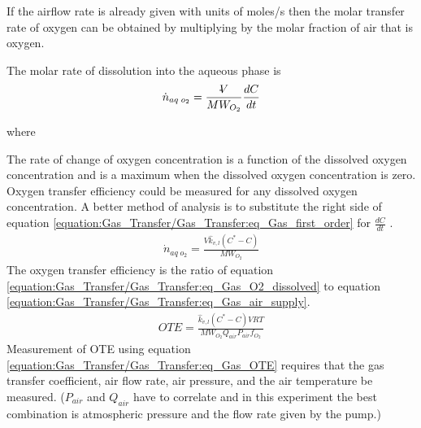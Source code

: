 \documentclass[letterpaper,10pt,english]{sphinxmanual}
\begin{document}
If the airflow rate is already given with units of moles/s then the molar transfer rate of oxygen can be obtained by multiplying by the molar fraction of air that is oxygen.

The molar rate of dissolution into the aqueous phase is
\begin{equation}\label{equation:Gas_Transfer/Gas_Transfer:Gas_Transfer/Gas_Transfer:3}
\begin{split}\dot{n}_{aq\; o_{2} } =\frac{\rlap{-} V}{MW_{O_{2} } } \frac{dC}{dt}\end{split}
\end{equation}\begin{description}
\item[{where}] \leavevmode
{}

\end{description}

The rate of change of oxygen concentration is a function of the dissolved oxygen concentration and is a maximum when the dissolved oxygen concentration is zero. Oxygen transfer efficiency could be measured for any dissolved oxygen concentration. A better method of analysis is to substitute the right side of equation \eqref{equation:Gas_Transfer/Gas_Transfer:eq_Gas_first_order} for \(\frac{dC}{dt}\) .
\begin{equation}\label{equation:Gas_Transfer/Gas_Transfer:eq_Gas_O2_dissolved}
\begin{split} \dot{n}_{aq\; o_{2} } =\frac{V\hat{k}_{v,l} \left(C^{*} -C\right)}{MW_{O_{2} } }\end{split}
\end{equation}
The oxygen transfer efficiency is the ratio of equation \eqref{equation:Gas_Transfer/Gas_Transfer:eq_Gas_O2_dissolved} to equation \eqref{equation:Gas_Transfer/Gas_Transfer:eq_Gas_air_supply}.
\begin{equation}\label{equation:Gas_Transfer/Gas_Transfer:eq_Gas_OTE}
\begin{split} OTE=\frac{\hat{k}_{v,l} \left(C^{*} -C\right)VRT}{MW_{O_{2} } Q_{air} P_{air} f_{O_{2} } }\end{split}
\end{equation}
Measurement of OTE using equation \eqref{equation:Gas_Transfer/Gas_Transfer:eq_Gas_OTE} requires that the gas transfer coefficient, air flow rate, air pressure, and the air temperature be measured. (\(P_{air}\) and \(Q_{air}\) have to correlate and in this experiment the best combination is atmospheric pressure and the flow rate given by the pump.)
\end{document}
